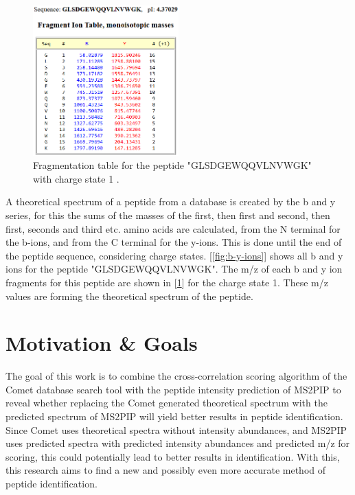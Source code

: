 \documentclass[11pt]{article}
\begin{document}
\begin{figure}
\centering
\includegraphics[width=0.5\textwidth]{figs/fragment-ion-table.png}
\caption{Fragmentation table for the peptide "GLSDGEWQQVLNVWGK" with charge state 1 \cite{b-y-frag}.}
\label{fig:fragment-table}
\end{figure}
A theoretical spectrum of a peptide from a database is created by the b and y series, for this the sums of the masses of the first, then first and second, then first, seconds and third etc. amino acids are calculated, from the N terminal for the b-ions, and from the C terminal for the y-ions. This is done until the end of the peptide sequence, considering charge states. [\cref{fig:b-y-ions}] shows all b and y ions for the peptide "GLSDGEWQQVLNVWGK".
The m/z of each b and y ion fragments for this peptide are shown in [\cref{fig:fragment-table}] for the charge state 1. These m/z values are forming the theoretical spectrum of the peptide. 

\newpage

\section{Motivation \& Goals}
The goal of this work is to combine the cross-correlation scoring algorithm of the Comet database search tool
with the peptide intensity prediction of MS2PIP to reveal whether replacing the Comet generated theoretical spectrum with the predicted spectrum of MS2PIP will yield better results in peptide identification. Since Comet uses theoretical spectra without intensity abundances, and MS2PIP uses predicted spectra with predicted intensity abundances and predicted m/z for scoring, this could potentially lead to better results in identification. With this, this research aims to find a new and possibly even more accurate method of peptide identification.
\end{document}
